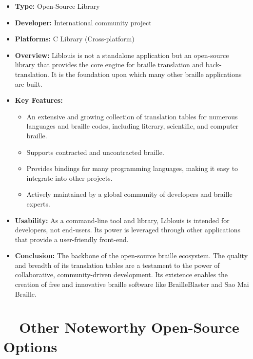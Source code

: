 \begin{itemize}
	\item \textbf{Type:} Open-Source Library
	\item \textbf{Developer:} International community project
	\item \textbf{Platforms:} C Library (Cross-platform)
	\item \textbf{Overview:} Liblouis \supercite{Liblouis} is not a standalone application but an open-source library that provides the core engine for braille translation and back-translation. It is the foundation upon which many other braille applications are built.
	\item \textbf{Key Features:}
	      \begin{itemize}
		      \item An extensive and growing collection of translation tables for numerous languages and braille codes, including literary, scientific, and computer braille.
		      \item Supports contracted and uncontracted braille.
		      \item Provides bindings for many programming languages, making it easy to integrate into other projects.
		      \item Actively maintained by a global community of developers and braille experts.
	      \end{itemize}
	\item \textbf{Usability:} As a command-line tool and library, Liblouis is intended for developers, not end-users. Its power is leveraged through other applications that provide a user-friendly front-end.
	\item \textbf{Conclusion:} The backbone of the open-source braille ecosystem. The quality and breadth of its translation tables are a testament to the power of collaborative, community-driven development. Its existence enables the creation of free and innovative braille software like BrailleBlaster and Sao Mai Braille.
\end{itemize}

\section{~~Other Noteworthy Open-Source Options}
\label{sec:other-noteworthy-open-source-options}


